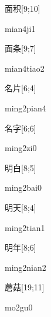 \begin{verbete}[mian4ji1]{面积}[9;10]
\begin{pronuncia}{mian4ji1}
\end{pronuncia}
\end{verbete}

\begin{verbete}{面条}[9;7]
\begin{pronuncia}{mian4tiao2}
\end{pronuncia}
\end{verbete}

\begin{verbete}{名片}[6;4]
\begin{pronuncia}{ming2pian4}
\end{pronuncia}
\end{verbete}

\begin{verbete}[ming2zi0]{名字}[6;6]
\begin{pronuncia}{ming2zi0}
\end{pronuncia}
\end{verbete}

\begin{verbete}{明白}[8;5]
\begin{pronuncia}{ming2bai0}
\end{pronuncia}
\end{verbete}

\begin{verbete}{明天}[8;4]
\begin{pronuncia}{ming2tian1}
\end{pronuncia}
\end{verbete}

\begin{verbete}{明年}[8;6]
\begin{pronuncia}{ming2nian2}
\end{pronuncia}
\end{verbete}

\begin{verbete}[mo2gu0]{蘑菇}[19;11]
\begin{pronuncia}{mo2gu0}
\end{pronuncia}
\end{verbete}

